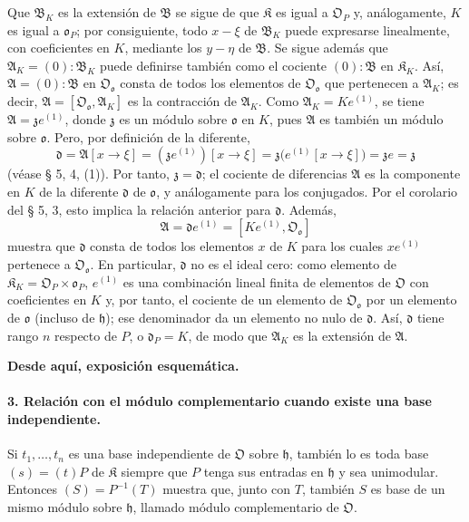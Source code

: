 Que $\mathfrak B_K$ es la extensión de $\mathfrak B$ se sigue de que $\mathfrak K$ es igual a $\mathfrak O_P$ y, análogamente, $K$ es igual a $\mathfrak o_P$; por consiguiente, todo $x-\xi$ de $\mathfrak B_K$ puede expresarse linealmente, con coeficientes en $K$, mediante los $y-\eta$ de $\mathfrak B$. Se sigue además que $\mathfrak A_K=(0):\mathfrak B_K$ puede definirse también como el cociente $(0):\mathfrak B$ en $\mathfrak K_K$. Así, $\mathfrak A=(0):\mathfrak B$ en $\mathfrak O_{\mathfrak o}$ consta de todos los elementos de $\mathfrak O_{\mathfrak o}$ que pertenecen a $\mathfrak A_K$; es decir, $\mathfrak A=[\mathfrak O_{\mathfrak o},\mathfrak A_K]$ es la contracción de $\mathfrak A_K$. Como $\mathfrak A_K=Ke^{(1)}$, se tiene $\mathfrak A=\mathfrak z e^{(1)}$, donde $\mathfrak z$ es un módulo sobre $\mathfrak o$ en $K$, pues $\mathfrak A$ es también un módulo sobre $\mathfrak o$. Pero, por definición de la diferente,
\[
\mathfrak d=\mathfrak A[x\to\xi]
=(\mathfrak z e^{(1)})[x\to\xi]
=\mathfrak z\bigl(e^{(1)}[x\to\xi]\bigr)=\mathfrak z e=\mathfrak z
\]
(véase § 5, 4, (1)). Por tanto, $\mathfrak z=\mathfrak d$; el cociente de diferencias $\mathfrak A$ es la componente en $K$ de la diferente $\mathfrak d$ de $\mathfrak o$, y análogamente para los conjugados. Por el corolario del § 5, 3, esto implica la relación anterior para $\mathfrak d$. Además,
\[
\mathfrak A=\mathfrak d e^{(1)}=[Ke^{(1)},\mathfrak O_{\mathfrak o}]
\]
muestra que $\mathfrak d$ consta de todos los elementos $x$ de $K$ para los cuales $xe^{(1)}$ pertenece a $\mathfrak O_{\mathfrak o}$. En particular, $\mathfrak d$ no es el ideal cero: como elemento de $\mathfrak K_K=\mathfrak O_P\times\mathfrak o_P$, $e^{(1)}$ es una combinación lineal finita de elementos de $\mathfrak O$ con coeficientes en $K$ y, por tanto, el cociente de un elemento de $\mathfrak O_{\mathfrak o}$ por un elemento de $\mathfrak o$ (incluso de $\mathfrak h$); ese denominador da un elemento no nulo de $\mathfrak d$. Así, $\mathfrak d$ tiene rango $n$ respecto de $P$, o $\mathfrak d_P=K$, de modo que $\mathfrak A_K$ es la extensión de $\mathfrak A$.

\begin{center}
\textbf{Desde aquí, exposición esquemática.}
\end{center}

\paragraph{3. Relación con el módulo complementario cuando existe una base independiente.}
Si $t_1,\ldots,t_n$ es una base independiente de $\mathfrak O$ sobre $\mathfrak h$, también lo es toda base $(s)=(t)P$ de $\mathfrak K$ siempre que $P$ tenga sus entradas en $\mathfrak h$ y sea unimodular. Entonces $(S)=P^{-1}(T)$ muestra que, junto con $T$, también $S$ es base de un mismo módulo sobre $\mathfrak h$, llamado módulo complementario de $\mathfrak O$.

